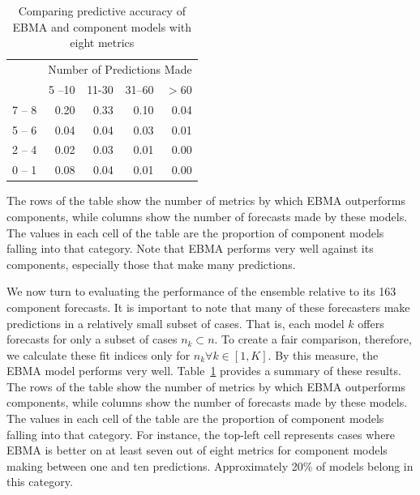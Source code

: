 \documentclass[12pt,fullpage,endnotes]{article}
\begin{document}
\begin{table}[ht]
\begin{center}
\caption{Comparing predictive accuracy of EBMA and component models with eight metrics}
\label{compareTable3}
\begin{tabular}{rrrrr}
\\
  \toprule

   &\multicolumn{4}{c}{Number of Predictions Made}\\
 & 5 --10& 11-30 & 31--60 & $>60$ \\ 
  \midrule
7 -- 8 & 0.20 & 0.33 & 0.10 & 0.04 \\ 
 5 -- 6  & 0.04 & 0.04 & 0.03 & 0.01 \\ 
 2 -- 4 & 0.02 & 0.03 & 0.01 & 0.00 \\ 
 0 -- 1 & 0.08 & 0.04 & 0.01 & 0.00 \\ 
   \bottomrule
\end{tabular}
\end{center}
The rows of the table show the number of metrics by which EBMA outperforms
components, while columns show the number of forecasts
made by these models. The values in each cell of the table are the
proportion of component models falling into that category. Note that EBMA
performs very well against its components, especially those that make
many predictions.
\end{table}



We now turn to evaluating the performance of the ensemble relative to
its 163 component forecasts.  It is important to note that many of
these forecasters make predictions in a relatively small subset of
cases.  That is, each model $k$ offers forecasts for only a subset of
cases $n_k \subset n$.  To create a fair comparison, therefore, we
calculate these fit indices only for $n_k \forall k \in [1,K]$.  By
this measure, the EBMA model performs very well.
Table~\ref{compareTable3} provides a summary of these results.  The
rows of the table show the number of metrics by which EBMA outperforms
components, while columns show the number of forecasts made by these
models. The values in each cell of the table are the proportion of
component models falling into that category.  For instance, the top-left
cell represents cases where EBMA is better on at least seven out of
eight metrics for component models making between one and ten
predictions.  Approximately 20\% of models belong in this category.
\end{document}

